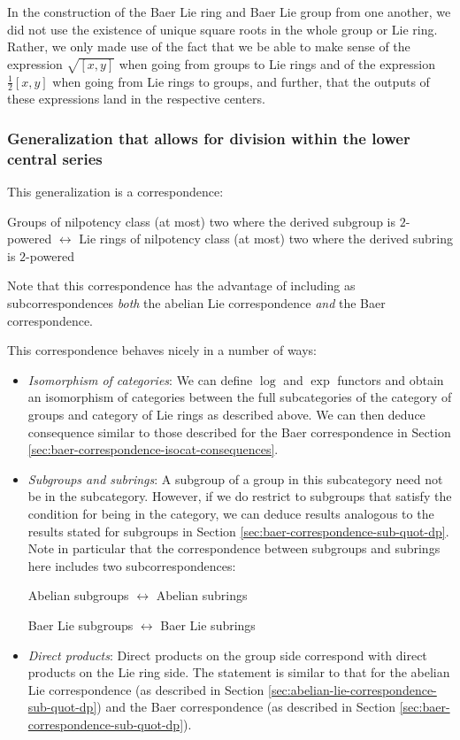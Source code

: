 \documentclass{ucetd}
\begin{document}
In the construction of the Baer Lie ring and Baer Lie group from one
another, we did not use the existence of unique square roots in the
whole group or Lie ring. Rather, we only made use of the fact that we
be able to make sense of the expression $\sqrt{[x,y]}$ when going from
groups to Lie rings and of the expression $\frac{1}{2}[x,y]$ when
going from Lie rings to groups, and further, that the outputs of these
expressions land in the respective centers.

\subsubsection{Generalization that allows for division within the lower central series}\label{sec:baer-correspondence-lcs-generalization}

This generalization is a correspondence:

Groups of nilpotency class (at most) two where the derived subgroup is
$2$-powered $\leftrightarrow$ Lie rings of nilpotency class (at most)
two where the derived subring is $2$-powered

Note that this correspondence has the advantage of including as
subcorrespondences {\em both} the abelian Lie correspondence {\em and}
the Baer correspondence.

This correspondence behaves nicely in a number of ways:

\begin{itemize}
\item {\em Isomorphism of categories}: We can define $\log$ and $\exp$
  functors and obtain an isomorphism of categories between the full
  subcategories of the category of groups and category of Lie rings as
  described above. We can then deduce consequence similar to those
  described for the Baer correspondence in Section
  \ref{sec:baer-correspondence-isocat-consequences}.
\item {\em Subgroups and subrings}: A subgroup of a group in this
  subcategory need not be in the subcategory. However, if we do
  restrict to subgroups that satisfy the condition for being in the
  category, we can deduce results analogous to the results stated for
  subgroups in Section \ref{sec:baer-correspondence-sub-quot-dp}. Note
  in particular that the correspondence between subgroups and subrings
  here includes two subcorrespondences:

  \begin{center}
    Abelian subgroups $\leftrightarrow$ Abelian subrings
  \end{center}

  \begin{center}
    Baer Lie subgroups $\leftrightarrow$ Baer Lie subrings
  \end{center}
\item {\em Direct products}: Direct products on the group side
  correspond with direct products on the Lie ring side. The statement
  is similar to that for the abelian Lie correspondence (as described
  in Section \ref{sec:abelian-lie-correspondence-sub-quot-dp}) and the
  Baer correspondence (as described in Section
  \ref{sec:baer-correspondence-sub-quot-dp}).
\end{itemize}
\end{document}
